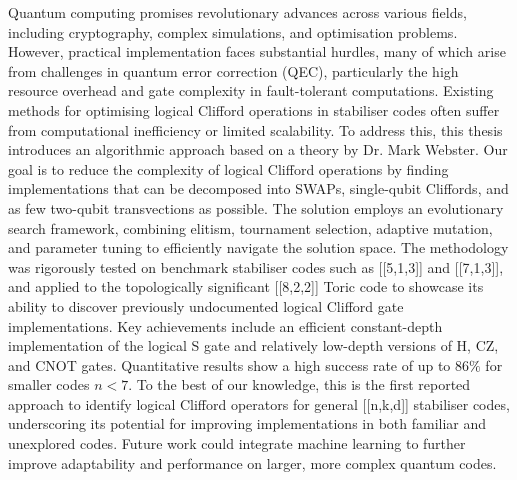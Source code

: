 Quantum computing promises revolutionary advances across various fields, including cryptography, complex simulations, and optimisation problems. However, practical implementation faces substantial hurdles, many of which arise from challenges in quantum error correction (QEC), particularly the high resource overhead and gate complexity in fault-tolerant computations. Existing methods for optimising logical Clifford operations in stabiliser codes often suffer from computational inefficiency or limited scalability. To address this, this thesis introduces an algorithmic approach based on a theory by Dr. Mark Webster. Our goal is to reduce the complexity of logical Clifford operations by finding implementations that can be decomposed into SWAPs, single-qubit Cliffords, and as few two-qubit transvections as possible. The solution employs an evolutionary search framework, combining elitism, tournament selection, adaptive mutation, and parameter tuning to efficiently navigate the solution space. The methodology was rigorously tested on benchmark stabiliser codes such as [[5,1,3]] and [[7,1,3]], and applied to the topologically significant [[8,2,2]] Toric code to showcase its ability to discover previously undocumented logical Clifford gate implementations. Key achievements include an efficient constant-depth implementation of the logical S gate and relatively low-depth versions of H, CZ, and CNOT gates. Quantitative results show a high success rate of up to \(86\%\) for smaller codes \(n<7\). To the best of our knowledge, this is the first reported approach to identify logical Clifford operators for general [[n,k,d]] stabiliser codes, underscoring its potential for improving implementations in both familiar and unexplored codes. Future work could integrate machine learning to further improve adaptability and performance on larger, more complex quantum codes.
